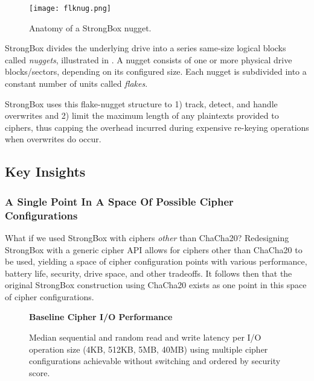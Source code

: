 \begin{figure}[ht]
   \centering
   \texttt{[image: flknug.png]}
   \caption{Anatomy of a StrongBox nugget.}\label{fig:flknug}
\end{figure}

StrongBox divides the underlying drive into a series same-size logical blocks
called \emph{nuggets}, illustrated in . A nugget consists of one
or more physical drive blocks/sectors, depending on its configured size. Each
nugget is subdivided into a constant number of units called \emph{flakes}.

StrongBox uses this flake-nugget structure to 1) track, detect, and handle
overwrites and 2) limit the maximum length of any plaintexts provided to
ciphers, thus capping the overhead incurred during expensive re-keying
operations when overwrites do occur.

\subsection{Key Insights}

\subsubsection{A Single Point In A Space Of Possible Cipher Configurations}
What if we used StrongBox with ciphers \textit{other} than ChaCha20? Redesigning
StrongBox with a generic cipher API allows for ciphers other than ChaCha20 to be
used, yielding a space of cipher configuration points with various performance,
battery life, security, drive space, and other tradeoffs. It follows then that
the original StrongBox construction using ChaCha20 exists as one point in this
space of cipher configurations.

\begin{figure}[ht] \textbf{Baseline Cipher I/O Performance}\par\medskip
   \centering
   {} \caption{Median sequential and random
   read and write latency per I/O operation size (4KB, 512KB, 5MB, 40MB) using
   multiple cipher configurations achievable without switching and ordered by
   security score.}
  \label{fig:tradeoff-no-ratios}
\end{figure}

